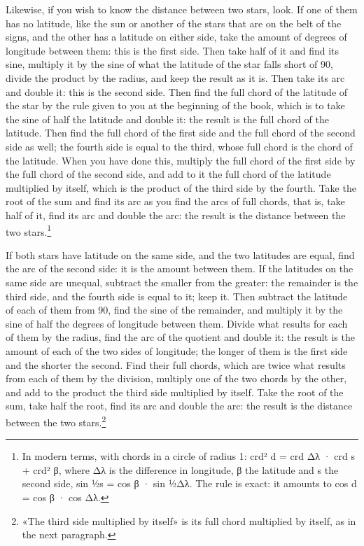 \documentclass[11pt]{article}
\newcommand{\ArPage}[1]{\marginpar{\footnotesize\color{gray}Ar.\,p.\,#1}}
\begin{document}
\par \ArPage{60}Likewise, if you wish to know the distance between two stars, look. If one of them has no latitude, like the sun or another of the stars that are on the belt of the signs, and the other has a latitude on either side, take the amount of degrees of longitude between them: this is the first side. Then take half of it and find its sine, multiply it by the sine of what the latitude of the star falls short of 90, divide the product by the radius, and keep the result as it is. Then take its arc and double it: this is the second side. Then find the full chord of the latitude of the star by the rule given to you at the beginning of the book, which is to take the sine of half the latitude and double it: the result is the full chord of the latitude. Then find the full chord of the first side and the full chord of the second side as well; the fourth side is equal to the third, whose full chord is the chord of the latitude. When you have done this, multiply the full chord of the first side by the full chord of the second side, and add to it the full chord of the latitude multiplied by itself, which is the product of the third side by the fourth. Take the root of the sum and find its arc as you find the arcs of full chords, that is, take half of it, find its arc and double the arc: the result is the distance between the two stars.\footnote{In modern terms, with chords in a circle of radius 1: crd² d = crd Δλ · crd s + crd² β, where Δλ is the difference in longitude, β the latitude and s the second side, sin ½s = cos β · sin ½Δλ. The rule is exact: it amounts to cos d = cos β · cos Δλ.}\par
\par If both stars have latitude on the same side, and the two latitudes are equal, find the arc of the second side: it is the amount between them. If the latitudes on the same side are unequal, subtract the smaller from the greater: the remainder is the third side, and the fourth side is equal to it; keep it. Then subtract the latitude of each of them from 90, find the sine of the remainder, and multiply it by the sine of half the degrees of longitude between them. Divide what results for each of them by the radius, find the arc of the quotient and double it: the result is the amount of each of the two sides of longitude; the longer of them is the first side and the shorter the second. Find their full chords, which are twice what results from each of them by the division, multiply one of the two chords by the other, and add to the product the third side multiplied by itself. Take the root of the sum, take half the root, find its arc and double the arc: the result is the distance between the two stars.\footnote{«The third side multiplied by itself» is its full chord multiplied by itself, as in the next paragraph.}\par
\end{document}
